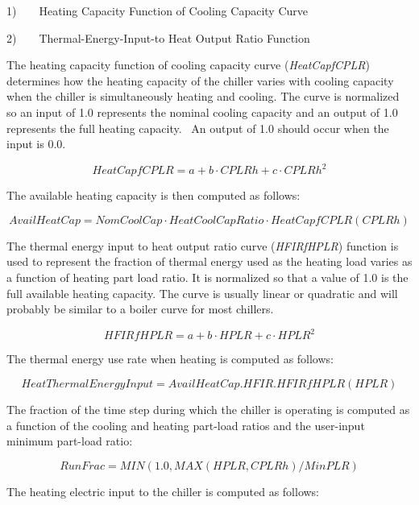 1)~~~~Heating Capacity Function of Cooling Capacity Curve

2)~~~~Thermal-Energy-Input-to Heat Output Ratio Function

The heating capacity function of cooling capacity curve (\emph{HeatCapfCPLR}) determines how the heating capacity of the chiller varies with cooling capacity when the chiller is simultaneously heating and cooling. The curve is normalized so an input of 1.0 represents the nominal cooling capacity and an output of 1.0 represents the full heating capacity.~ An output of 1.0 should occur when the input is 0.0.

\begin{equation}
HeatCapfCPLR = a + b \cdot CPLRh + c \cdot CPLR{h^2}
\end{equation}

The available heating capacity is then computed as follows:

\begin{equation}
AvailHeatCap = NomCoolCap \cdot HeatCoolCapRatio \cdot HeatCapfCPLR(CPLRh)
\end{equation}

The thermal energy input to heat output ratio curve (\emph{HFIRfHPLR}) function is used to represent the fraction of thermal energy used as the heating load varies as a function of heating part load ratio. It is normalized so that a value of 1.0 is the full available heating capacity. The curve is usually linear or quadratic and will probably be similar to a boiler curve for most chillers.

\begin{equation}
HFIRfHPLR = a + b \cdot HPLR + c \cdot HPL{R^2}
\end{equation}

The thermal energy use rate when heating is computed as follows:

\begin{equation}
HeatThermalEnergyInput = AvailHeatCap.HFIR.HFIRfHPLR(HPLR)
\end{equation}

The fraction of the time step during which the chiller is operating is computed as a function of the cooling and heating part-load ratios and the user-input minimum part-load ratio:

\begin{equation}
RunFrac = MIN(1.0,MAX\left( {HPLR,CPLRh} \right)/MinPLR)
\end{equation}

The heating electric input to the chiller is computed as follows:

